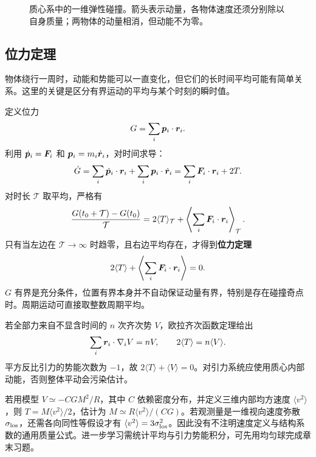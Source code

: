 \begin{figure}[htbp]
\centering
{}
\caption{质心系中的一维弹性碰撞。箭头表示动量，各物体速度还须分别除以自身质量；两物体的动量相消，但动能不为零。}
\label{fig:ch1-cm-collision}
\end{figure}

\subsection{位力定理}

物体绕行一周时，动能和势能可以一直变化，但它们的长时间平均可能有简单关系。这里的关键是区分有界运动的平均与某个时刻的瞬时值。

定义位力
\begin{equation}
G=\sum_i\boldsymbol{p}_i\cdot\boldsymbol{r}_i .
\end{equation}
利用 \(\dot{\boldsymbol{p}}_i=\boldsymbol{F}_i\) 和 \(\boldsymbol{p}_i=m_i\dot{\boldsymbol{r}}_i\)，对时间求导：
\begin{equation}
\dot G=\sum_i\dot{\boldsymbol{p}}_i\cdot\boldsymbol{r}_i+\sum_i\boldsymbol{p}_i\cdot\dot{\boldsymbol{r}}_i
=\sum_i\boldsymbol{F}_i\cdot\boldsymbol{r}_i+2T .
\end{equation}
对时长 $\mathcal T$ 取平均，严格有
\[
\frac{G(t_0+\mathcal T)-G(t_0)}{\mathcal T}
=2\langle T\rangle_{\mathcal T}
+\left\langle\sum_i\boldsymbol{F}_i\cdot\boldsymbol{r}_i\right\rangle_{\mathcal T}.
\]
只有当左边在 $\mathcal T\to\infty$ 时趋零，且右边平均存在，才得到\textbf{位力定理}
\begin{equation}
2\langle T\rangle+\left\langle\sum_i\boldsymbol{F}_i\cdot\boldsymbol{r}_i\right\rangle=0.
\label{eq:virial-ch1}
\end{equation}
$G$ 有界是充分条件，位置有界本身并不自动保证动量有界，特别是存在碰撞奇点时。周期运动可直接取整数周期平均。

若全部力来自不显含时间的 $n$ 次齐次势 $V$，欧拉齐次函数定理给出
\[
\sum_i\boldsymbol{r}_i\cdot\nabla_iV=nV,\qquad 2\langle T\rangle=n\langle V\rangle.
\]
平方反比引力的势能次数为 $-1$，故 $2\langle T\rangle+\langle V\rangle=0$。对引力系统应使用质心内部动能，否则整体平动会污染估计。
\begin{modernbox}[title={进一步探索：位力质量估计的假设}]
若用模型 $V\simeq-CGM^2/R$，其中 $C$ 依赖密度分布，并定义三维内部均方速度 $\langle v^2\rangle$，则 $T=M\langle v^2\rangle/2$，估计为 $M\simeq R\langle v^2\rangle/(CG)$。若观测量是一维视向速度弥散 $\sigma_{\rm los}$，还需各向同性等假设才有 $\langle v^2\rangle=3\sigma_{\rm los}^2$。因此没有不注明速度定义与结构系数的通用质量公式。进一步学习需统计平均与引力势能积分，可先用均匀球完成章末习题。
\end{modernbox}

